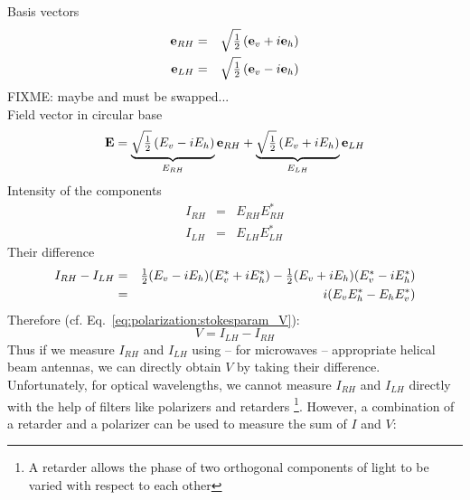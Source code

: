 Basis vectors
\begin{eqnarray}
  \label{eq:polarization:e_Rh}
  \mathbf{e}_{RH} &=& \sqrt{\textstyle\frac{1}{2}} \left( \mathbf{e}_v + i\mathbf{e}_h \right) \\
  \label{eq:polarization:e_Lh}
  \mathbf{e}_{LH} &=& \sqrt{\textstyle\frac{1}{2}} \left( \mathbf{e}_v - i\mathbf{e}_h \right) 
\end{eqnarray}
%
FIXME: maybe \eRh{} and \eLh{} must be swapped...\\
Field vector in circular base
\begin{equation}
  \label{eq:polarization:E_circbase}
  \mathbf{E} = \underbrace{
               \sqrt{\textstyle\frac{1}{2}}\left(E_v -  i E_h \right)}_{E_{RH}} 
               \mathbf{e}_{RH} 
              + \underbrace{
               \sqrt{\textstyle\frac{1}{2}}\left(E_v +  i E_h \right)}_{E_{LH}} 
               \mathbf{e}_{LH} 
\end{equation}
%
Intensity of the components
\begin{eqnarray}
  \label{eq:polarization:IRH}
  I_{RH} &=& E_{RH} E_{RH}^\ast\\
  \label{eq:polarization:ILH}
  I_{LH} &=& E_{LH} E_{LH}^\ast
\end{eqnarray}
%
Their difference
\begin{eqnarray}
   I_{RH} -  I_{LH}
   &=&
     \textstyle\frac{1}{2} (E_v - i E_h) (E_v^\ast + i E_h^\ast)
    - \textstyle\frac{1}{2} (E_v + i E_h) (E_v^\ast - i E_h^\ast)\\ \nonumber
   &=&
   i (E_v E_h^\ast -  E_h E_v^\ast)
  \label{eq:polarization:Idiff_circbase}
\end{eqnarray}
Therefore (cf. Eq.~\ref{eq:polarization:stokesparam_V}):
\begin{equation}
  \label{eq:polarization:V_Idiff}
  V =   I_{LH} -  I_{RH}
\end{equation}
%
Thus if we measure $I_{RH}$ and $I_{LH}$ using -- for microwaves --
appropriate helical beam antennas, we can directly obtain $V$ by
taking their difference.  Unfortunately, for optical wavelengths, we
cannot measure $I_{RH}$ and $I_{LH}$ directly with the help of
filters like  polarizers and retarders%
\footnote{A retarder allows the phase of two orthogonal components 
of light to be varied  with respect to each other}.  
However, a combination of a retarder and a polarizer can be used
to measure the sum of $I$ and $V$:

